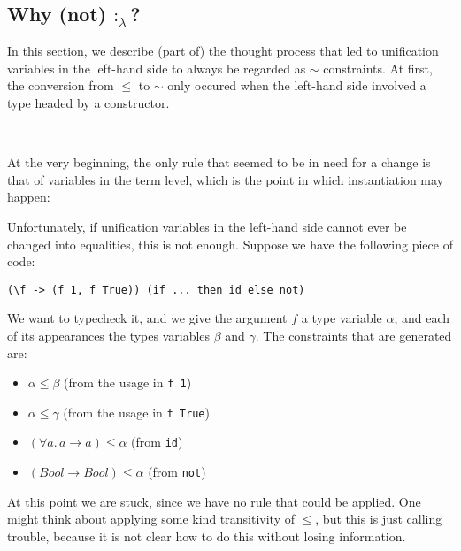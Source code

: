 \documentclass[12pt]{article}
\begin{document}
\subsection{Why (not) $:_\lambda$?}

In this section, we describe (part of) the thought process that led to unification variables in the left-hand side to always be regarded as $\sim$ constraints. At first, the conversion from $\leq$ to $\sim$ only occured when the left-hand side involved a type headed by a constructor.

\

At the very beginning, the only rule that seemed to be in need for a change is that of variables in the term level, which is the point in which instantiation may happen:
\begin{prooftree}
\end{prooftree}
Unfortunately, if unification variables in the left-hand side cannot ever be changed into equalities, this is not enough. Suppose we have the following piece of code:
\begin{verbatim}
(\f -> (f 1, f True)) (if ... then id else not)
\end{verbatim}
We want to typecheck it, and we give the argument $f$ a type variable $\alpha$, and each of its appearances the types variables $\beta$ and $\gamma$. The constraints that are generated are:
\begin{itemize}
\item $\alpha \leq \beta$ (from the usage in {\tt f 1})
\item $\alpha \leq \gamma$ (from the usage in {\tt f True})
\item $(\forall a. \, a \to a) \leq \alpha$ (from {\tt id})
\item $(Bool \to Bool) \leq \alpha$ (from {\tt not})
\end{itemize}
At this point we are stuck, since we have no rule that could be applied. One might think about applying some kind transitivity of $\leq$, but this is just calling trouble, because it is not clear how to do this without losing information.

\
\end{document}
